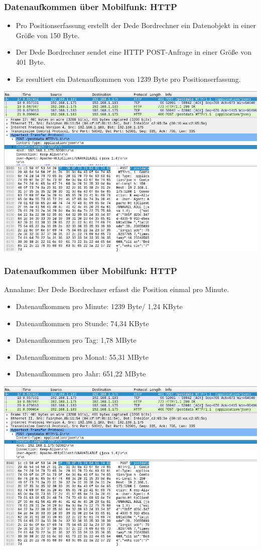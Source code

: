 \begin{frame}
  \frametitle{Datenaufkommen über Mobilfunk: HTTP}
  \begin{itemize}
  \item Pro Positionserfassung erstellt der Dede Bordrechner ein Datenobjekt in einer Größe von 150 Byte.
  \item Der Dede Bordrechner sendet eine HTTP POST-Anfrage in einer Größe von 401 Byte.
  \item Es resultiert ein Datenaufkommen von 1239 Byte pro Positionserfassung.
  \end{itemize}
  \includegraphics[width=0.5\paperwidth]{dede/dede-obc-wireshark-http-post}
\end{frame}

\begin{frame}
  \frametitle{Datenaufkommen über Mobilfunk: HTTP}
  Annahme: Der Dede Bordrechner erfasst die Position einmal pro Minute.
  \begin{itemize}
  \item Datenaufkommen pro Minute: 1239 Byte/ 1,24 KByte
  \item Datenaufkommen pro Stunde: 74,34 KByte
  \item Datenaufkommen pro Tag: 1,78 MByte
  \item Datenaufkommen pro Monat: 55,31 MByte
  \item Datenaufkommen pro Jahr: 651,22 MByte
  \end{itemize}
  \includegraphics[width=0.5\paperwidth]{dede/dede-obc-wireshark-http-post}
\end{frame}

